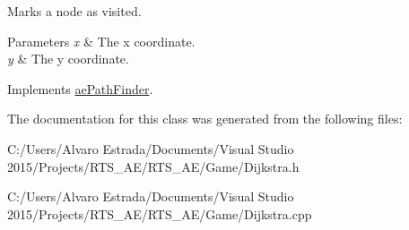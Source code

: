 Marks a node as visited. 


\begin{DoxyParams}{Parameters}
{\em x} & The x coordinate. \\
\hline
{\em y} & The y coordinate. \\
\hline
\end{DoxyParams}


Implements \hyperlink{classae_path_finder_a4ccfa19ff344b9f4827dbeab18c4efab}{ae\+Path\+Finder}.



The documentation for this class was generated from the following files\+:\begin{DoxyCompactItemize}
\item 
C\+:/\+Users/\+Alvaro Estrada/\+Documents/\+Visual Studio 2015/\+Projects/\+R\+T\+S\+\_\+\+A\+E/\+R\+T\+S\+\_\+\+A\+E/\+Game/Dijkstra.\+h\item 
C\+:/\+Users/\+Alvaro Estrada/\+Documents/\+Visual Studio 2015/\+Projects/\+R\+T\+S\+\_\+\+A\+E/\+R\+T\+S\+\_\+\+A\+E/\+Game/Dijkstra.\+cpp\end{DoxyCompactItemize}
